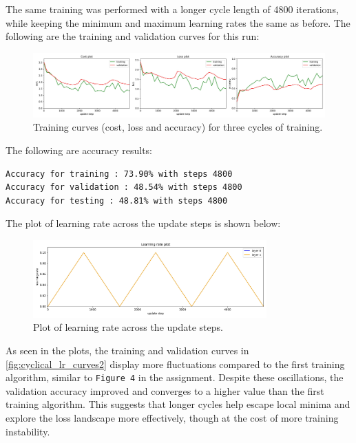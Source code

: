 \documentclass[11pt]{article}
\begin{document}
The same training was performed with a longer cycle length of 4800 iterations, while keeping the minimum and maximum learning rates the same as before.
The following are the training and validation curves for this run:
\begin{figure}[H]
    \centering
    \includegraphics[width=1\textwidth]{cyclic_training_curves_ex4.jpg}
    \caption{Training curves (cost, loss and accuracy) for three cycles of training.}
    \label{fig:cyclical_lr_curves2}
\end{figure}

The following are accuracy results:

\begin{lstlisting}[caption={Training and validation accuracy for three cycles}, label={lst:accuracy2}]
Accuracy for training : 73.90% with steps 4800
Accuracy for validation : 48.54% with steps 4800
Accuracy for testing : 48.81% with steps 4800
\end{lstlisting}

The plot of learning rate across the update steps is shown below:
\begin{figure}[H]
    \centering
    \includegraphics[width=0.8\textwidth]{cyclic_eta2.jpg}
    \caption{Plot of learning rate across the update steps.}
    \label{fig:cyclic_eta2}
\end{figure}

As seen in the plots, the training and validation curves in \autoref{fig:cyclical_lr_curves2} display more fluctuations compared to the first training algorithm, similar to \texttt{Figure 4} in the assignment. 
Despite these oscillations, the validation accuracy improved and converges to a higher value than the first training algorithm.
This suggests that longer cycles help escape local minima and explore the loss landscape more effectively, though at the cost of more training instability.
\end{document}
